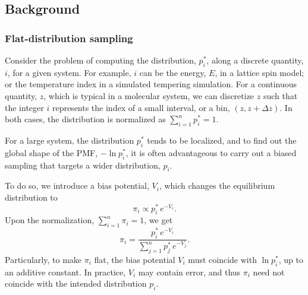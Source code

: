 \documentclass[reprint, floatfix]{revtex4-1}
\begin{document}
\subsection{\label{sec:background}
Background}



\subsubsection{\label{sec:FDS}
Flat-distribution sampling}



Consider the problem of computing
the distribution, $p^*_i$,
along a discrete quantity, $i$,
for a given system.
%
%
For example, $i$ can be the energy, $E$,
in a lattice spin model; or the temperature index
in a simulated tempering simulation\cite{
marinari1992, lyubartsev1992}.
%
For a continuous quantity, $z$,
which is typical in a molecular system,
we can discretize $z$
such that the integer $i$ represents
the index of a small interval, or a bin,
$(z, z + \Delta z)$.
%
In both cases,
the distribution is normalized as
$\sum_{i = 1}^n p^*_i = 1$.



For a large system,
the distribution $p^*_i$ tends to
be localized,
%
and to find out the global shape
of the PMF, $-\ln p^*_i$,
it is often advantageous to carry out
a biased sampling that targets
a wider distribution, $p_i$.
%



To do so, we introduce a bias potential, $V_i$,
which changes the equilibrium distribution to
%
\begin{equation}
  \pi_i \propto p^*_i \, e^{-V_i}.
  \label{eq:pi_p_phi1}
\end{equation}
%
Upon the normalization,
$\sum_{i = 1}^n \pi_i = 1$,
we get
%
\begin{equation}
  \pi_i
  =
  \frac{                p^*_i \, e^{-V_i} }
       { \sum_{j = 1}^n p^*_j \, e^{-V_j} }
  .
  \label{eq:pi_p_phi}
\end{equation}
%
Particularly,
to make $\pi_i$ flat,
the bias potential $V_i$
must coincide with $\ln p^*_i$,
up to an additive constant.
%
In practice, $V_i$ may contain error,
and thus $\pi_i$ need not
coincide with the intended distribution $p_i$.
\end{document}
